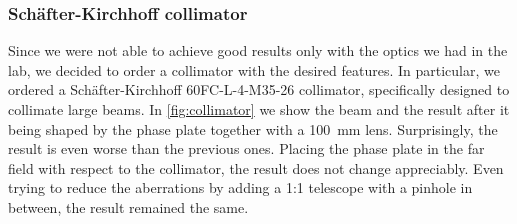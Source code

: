 \subsubsection{Schäfter-Kirchhoff collimator}
Since we were not able to achieve good results only with the optics we had in the lab, we decided to order a collimator with the desired features. In particular, we ordered a Schäfter-Kirchhoff 60FC-L-4-M35-26 collimator, specifically designed to collimate large beams. In \cref{fig:collimator} we show the beam and the result after it being shaped by the phase plate together with a \SI{100}{mm} lens. Surprisingly, the result is even worse than the previous ones. Placing the phase plate in the far field with respect to the collimator, the result does not change appreciably. Even trying to reduce the aberrations by adding a 1:1 telescope with a pinhole in between, the result remained the same.

